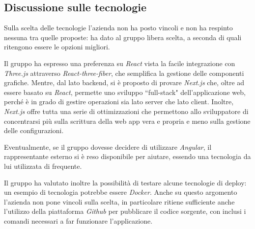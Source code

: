 \subsection{Discussione sulle tecnologie}
Sulla scelta delle tecnologie l'azienda non ha posto vincoli e non ha respinto nessuna tra quelle proposte: ha dato al gruppo libera scelta, a seconda di quali ritengono essere le opzioni migliori.
\par Il gruppo ha espresso una preferenza su \textit{React} vista la facile integrazione con \textit{Three.js} attraverso \textit{React-three-fiber}, che semplifica la gestione delle componenti grafiche. Mentre, dal lato backend, si è proposto di provare \textit{Next.js} che, oltre ad essere basato su \textit{React}, permette uno sviluppo ``full-stack" dell'applicazione web, perché è in grado di gestire operazioni sia lato server che lato client. Inoltre, \textit{Next.js} offre tutta una serie di ottimizzazioni che permettono allo sviluppatore di concentrarsi più sulla scrittura della web app vera e propria e meno sulla gestione delle configurazioni.
\par Eventualmente, se il gruppo dovesse decidere di utilizzare \textit{Angular}, il rappresentante esterno si è reso disponibile per aiutare, essendo una tecnologia da lui utilizzata di frequente.
\par Il gruppo ha valutato inoltre la possibilità di testare alcune tecnologie di deploy: un esempio di tecnologia potrebbe essere \textit{Docker}. Anche su questo argomento l'azienda non pone vincoli sulla scelta, in particolare ritiene sufficiente anche l'utilizzo della piattaforma \textit{Github} per pubblicare il codice sorgente, con inclusi i comandi necessari a far funzionare l'applicazione.